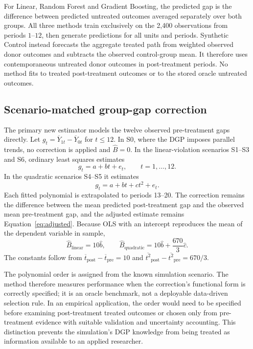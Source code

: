 \documentclass[11pt,a4paper]{article}
\begin{document}
For Linear, Random Forest and Gradient Boosting, the predicted gap is the difference between predicted untreated outcomes averaged separately over both groups. All three methods train exclusively on the 2,400 observations from periods $1$--$12$, then generate predictions for all units and periods. Synthetic Control instead forecasts the aggregate treated path from weighted observed donor outcomes and subtracts the observed control-group mean. It therefore uses contemporaneous untreated donor outcomes in post-treatment periods. No method fits to treated post-treatment outcomes or to the stored oracle untreated outcomes.


\subsection{Scenario-matched group-gap correction}\label{sec:matchedmethod}
The primary new estimator models the twelve observed pre-treatment gaps directly. Let $g_t=\overline Y_{1t}-\overline Y_{0t}$ for $t\leq12$. In S0, where the DGP imposes parallel trends, no correction is applied and $\widehat B=0$. In the linear-violation scenarios S1--S3 and S6, ordinary least squares estimates
\begin{equation}\label{eq:lineargap}
g_t=a+bt+e_t,\qquad t=1,\ldots,12.
\end{equation}
In the quadratic scenarios S4--S5 it estimates
\begin{equation}\label{eq:quadraticgap}
g_t=a+bt+ct^2+e_t.
\end{equation}
Each fitted polynomial is extrapolated to periods 13--20. The correction remains the difference between the mean predicted post-treatment gap and the observed mean pre-treatment gap, and the adjusted estimate remains Equation~\ref{eq:adjusted}. Because OLS with an intercept reproduces the mean of the dependent variable in sample,
\begin{equation}\label{eq:gapclosedform}
\widehat B_{\mathrm{linear}}=10\widehat b,
\qquad
\widehat B_{\mathrm{quadratic}}=10\widehat b+\frac{670}{3}\widehat c.
\end{equation}
The constants follow from $\overline t_{\mathrm{post}}-\overline t_{\mathrm{pre}}=10$ and $\overline{t^2}_{\mathrm{post}}-\overline{t^2}_{\mathrm{pre}}=670/3$.

The polynomial order is assigned from the known simulation scenario. The method therefore measures performance when the correction's functional form is correctly specified; it is an oracle benchmark, not a deployable data-driven selection rule. In an empirical application, the order would need to be specified before examining post-treatment treated outcomes or chosen only from pre-treatment evidence with suitable validation and uncertainty accounting. This distinction prevents the simulation's DGP knowledge from being treated as information available to an applied researcher.
\end{document}
